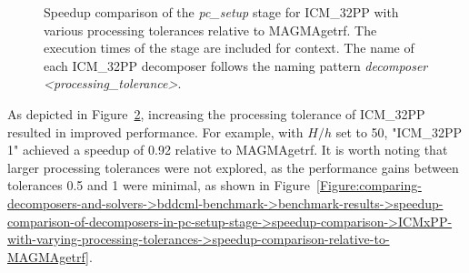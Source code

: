 \begin{figure}[ht!]
\begin{subfigure}{\textwidth}
		\label{Figure:comparing-decomposers-and-solvers->bddcml-benchmark->benchmark-results->speedup-comparison-of-decomposers-in-pc-setup-stage->speedup-comparison->ICMxPP-with-varying-processing-tolerances->pc-setup-time-with-MAGMAgetrf}
	\end{subfigure}
	\caption{Speedup comparison of the \textit{pc\_setup} stage for ICM\_32PP with various processing tolerances relative to MAGMAgetrf.
		The execution times of the stage are included for context.
		The name of each ICM\_32PP decomposer follows the naming pattern \textit{decomposer <processing\_tolerance>}.
	}
	\label{Figure:comparing-decomposers-and-solvers->bddcml-benchmark->benchmark-results->speedup-comparison-of-decomposers-in-pc-setup-stage->speedup-comparison->ICMxPP-with-varying-processing-tolerances->speedup-comparison-relative-to-MAGMAgetrf-and-pc-setup-execution-time}
\end{figure}

As depicted in Figure~\ref{Figure:comparing-decomposers-and-solvers->bddcml-benchmark->benchmark-results->speedup-comparison-of-decomposers-in-pc-setup-stage->speedup-comparison->ICMxPP-with-varying-processing-tolerances->speedup-comparison-relative-to-MAGMAgetrf-and-pc-setup-execution-time}, increasing the processing tolerance of ICM\_32PP resulted in  improved performance.
For example, with $H/h$ set to 50, "ICM\_32PP 1" achieved a speedup of 0.92 relative to MAGMAgetrf.
It is worth noting that larger processing tolerances were not explored, as the performance gains between tolerances 0.5 and 1 were minimal, as shown in Figure~\ref{Figure:comparing-decomposers-and-solvers->bddcml-benchmark->benchmark-results->speedup-comparison-of-decomposers-in-pc-setup-stage->speedup-comparison->ICMxPP-with-varying-processing-tolerances->speedup-comparison-relative-to-MAGMAgetrf}.

